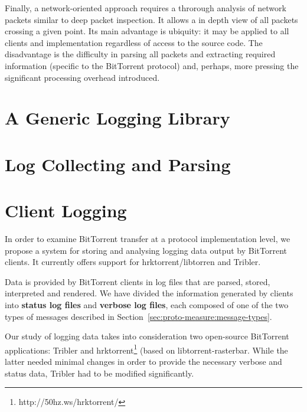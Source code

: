 Finally, a network-oriented approach requires a throrough analysis of network
packets similar to deep packet inspection. It allows a in depth view of all
packets crossing a given point. Its main advantage is ubiquity: it may be
applied to all clients and implementation regardless of access to the source
code. The disadvantage is the difficulty in parsing all packets and extracting
required information (specific to the BitTorrent protocol) and, perhaps, more
pressing the significant processing overhead introduced.


\section{A Generic Logging Library}
\label{sec:proto-measure:log-library}


\section{Log Collecting and Parsing}
\label{sec:proto-measure:log-collect-parse}


\section{Client Logging}
\label{sec:results-logging}

In order to examine BitTorrent transfer at a protocol implementation level, we
propose a system for storing and analysing logging data output by BitTorrent
clients. It currently offers support for hrktorrent/libtorren and Tribler.

Data is provided by BitTorrent clients in log files that are parsed, stored,
interpreted and rendered. We have divided the information generated by clients
into \textbf{status log files} and \textbf{verbose log files}, each composed
of one of the two types of messages described in
Section~\ref{sec:proto-measure:message-types}.

Our study of logging data takes into consideration two open-source BitTorrent
applications: Tribler and hrktorrent\footnote{http://50hz.ws/hrktorrent/}
(based on libtorrent-rasterbar. While the latter needed minimal changes in
order to provide the necessary verbose and status data, Tribler had to be
modified significantly.

